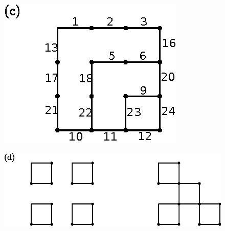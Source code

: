 \begin{enumerate}
\begin{minipage}[c]{4.5cm}
\begin{figure}[H]
\end{figure}
\end{minipage}
\begin{minipage}[c]{4.5cm}
\begin{figure}[H]
\centering
\includegraphics{images/chap8/ans13c.eps}

\end{figure}
\end{minipage}


\begin{figure}[H]
\centering
{}

\includegraphics{images/chap8/ans13d.eps}

\end{figure}


\end{enumerate}
